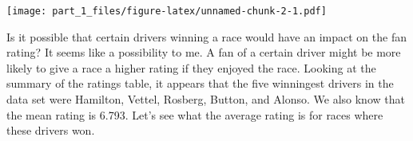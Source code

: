 \documentclass[]{article}
\newenvironment{Shaded}{\begin{snugshade}}{\end{snugshade}}
\newcommand{\KeywordTok}[1]{\textcolor[rgb]{0.13,0.29,0.53}{\textbf{#1}}}
\newcommand{\DataTypeTok}[1]{\textcolor[rgb]{0.13,0.29,0.53}{#1}}
\newcommand{\FloatTok}[1]{\textcolor[rgb]{0.00,0.00,0.81}{#1}}
\newcommand{\StringTok}[1]{\textcolor[rgb]{0.31,0.60,0.02}{#1}}
\newcommand{\OperatorTok}[1]{\textcolor[rgb]{0.81,0.36,0.00}{\textbf{#1}}}
\newcommand{\NormalTok}[1]{#1}
\begin{document}
\begin{Shaded}
\end{Shaded}

\texttt{[image: part\_1\_files/figure-latex/unnamed-chunk-2-1.pdf]}

Is it possible that certain drivers winning a race would have an impact
on the fan rating? It seems like a possibility to me. A fan of a certain
driver might be more likely to give a race a higher rating if they
enjoyed the race. Looking at the summary of the ratings table, it
appears that the five winningest drivers in the data set were Hamilton,
Vettel, Rosberg, Button, and Alonso. We also know that the mean rating
is 6.793. Let's see what the average rating is for races where these
drivers won.

\begin{Shaded}
\end{Shaded}
\end{document}
